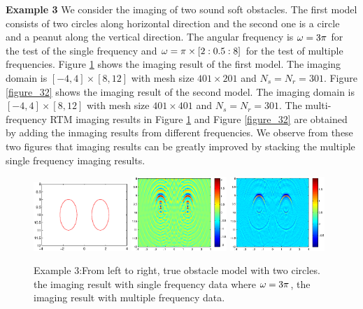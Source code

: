 \documentclass[12pt]{iopart}
\begin{document}
\bigskip
\textbf{Example 3} We consider the imaging of two sound soft obstacles. The first model
consists of two circles along horizontal direction and the second one is a circle and a
peanut along the vertical direction. The angular frequency is $\omega=3\pi$ for the test of the single frequency and $\omega=\pi\times[2:0.5:8]$ for the test of multiple frequencies. Figure \ref{figure_31} shows the imaging result of the first model. The
imaging domain is $[−4, 4] \times [8,12]$ with mesh size $401 \times 201$ and $N_s = N_r = 301$. Figure \ref{figure_32}
 shows the imaging result of the second model. The
 imaging domain is $[−4, 4] \times [8,12]$ with mesh size $401 \times 401$ and $N_s = N_r = 301$. The multi-frequency RTM imaging results in Figure \ref{figure_31} and Figure \ref{figure_32} are obtained by adding the inmaging results from different frequencies. We observe from these two figures that imaging results can be greatly improved by stacking the multiple single frequency imaging results. 
\begin{figure}
	\centering
	\includegraphics[width=0.32\textwidth,height=0.16\textheight]{./graphic/bi_circle_profile.eps}
	\includegraphics[width=0.32\textwidth]{./graphic/bi_circle_3pi.eps}
	\includegraphics[width=0.32\textwidth]{./graphic/bi_circle.eps}
	
	\caption{Example 3:From left to right,  true obstacle model with two circles. the imaging result
		with single frequency data where $\omega=3\pi$, the imaging result with multiple frequency data.}\label{figure_31}
\end{figure}
\end{document}
